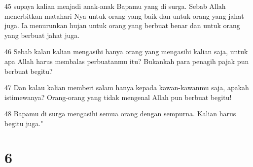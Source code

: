 \par 45 supaya kalian menjadi anak-anak Bapamu yang di surga. Sebab Allah menerbitkan matahari-Nya untuk orang yang baik dan untuk orang yang jahat juga. Ia menurunkan hujan untuk orang yang berbuat benar dan untuk orang yang berbuat jahat juga.
\par 46 Sebab kalau kalian mengasihi hanya orang yang mengasihi kalian saja, untuk apa Allah harus membalas perbuatanmu itu? Bukankah para penagih pajak pun berbuat begitu?
\par 47 Dan kalau kalian memberi salam hanya kepada kawan-kawanmu saja, apakah istimewanya? Orang-orang yang tidak mengenal Allah pun berbuat begitu!
\par 48 Bapamu di surga mengasihi semua orang dengan sempurna. Kalian harus begitu juga."

\chapter{6}


